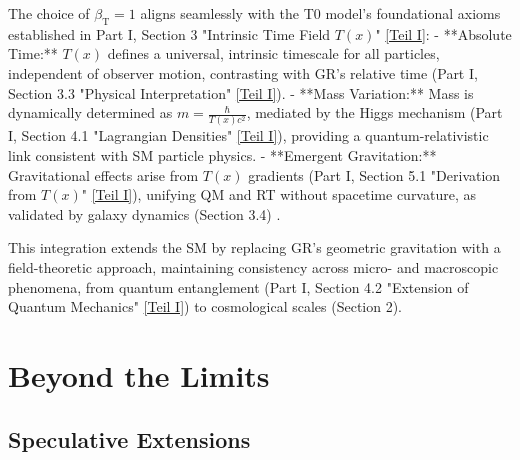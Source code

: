 \documentclass[12pt,a4paper]{article}
\newcommand{\Tfield}{T(x)}
\newcommand{\betaT}{\beta_{\text{T}}}
\begin{document}
	The choice of \(\betaT = 1\) aligns seamlessly with the T0 model’s foundational axioms established in Part I, Section 3 "Intrinsic Time Field \(\Tfield\)" \href{https://github.com/jpascher/T0-Time-Mass-Duality/tree/main/2/pdf/English/Bridging Quantum Mechanics and Relativity through Time-Mass Duality Part I Theoretical Foundations_en.pdf}{[Teil I]}:
	- **Absolute Time:** \(\Tfield\) defines a universal, intrinsic timescale for all particles, independent of observer motion, contrasting with GR’s relative time (Part I, Section 3.3 "Physical Interpretation" \href{https://github.com/jpascher/T0-Time-Mass-Duality/tree/main/2/pdf/English/Bridging Quantum Mechanics and Relativity through Time-Mass Duality Part I Theoretical Foundations_en.pdf}{[Teil I]}).
	- **Mass Variation:** Mass is dynamically determined as \(m = \frac{\hbar}{\Tfield c^2}\), mediated by the Higgs mechanism (Part I, Section 4.1 "Lagrangian Densities" \href{https://github.com/jpascher/T0-Time-Mass-Duality/tree/main/2/pdf/English/Bridging Quantum Mechanics and Relativity through Time-Mass Duality Part I Theoretical Foundations_en.pdf}{[Teil I]}), providing a quantum-relativistic link consistent with SM particle physics.
	- **Emergent Gravitation:** Gravitational effects arise from \(\Tfield\) gradients (Part I, Section 5.1 "Derivation from \(\Tfield\)" \href{https://github.com/jpascher/T0-Time-Mass-Duality/tree/main/2/pdf/English/Bridging Quantum Mechanics and Relativity through Time-Mass Duality Part I Theoretical Foundations_en.pdf}{[Teil I]}), unifying QM and RT without spacetime curvature, as validated by galaxy dynamics (Section 3.4) \cite{pascher_lagrange_2025}.
	
	This integration extends the SM by replacing GR’s geometric gravitation with a field-theoretic approach, maintaining consistency across micro- and macroscopic phenomena, from quantum entanglement (Part I, Section 4.2 "Extension of Quantum Mechanics" \href{https://github.com/jpascher/T0-Time-Mass-Duality/tree/main/2/pdf/English/Bridging Quantum Mechanics and Relativity through Time-Mass Duality Part I Theoretical Foundations_en.pdf}{[Teil I]}) to cosmological scales (Section 2).
	
	\section{Beyond the Limits}
	\label{sec:beyond_limits}
	
	\subsection{Speculative Extensions}
	\label{subsec:speculative_extensions}
	
\end{document}

